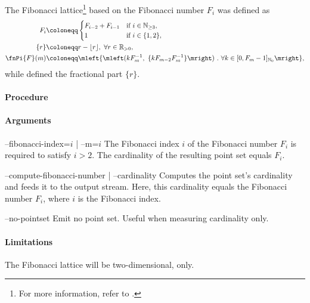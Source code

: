 
The Fibonacci lattice\footnote{For more information, refer to .} based on the Fibonacci number $F_i$ was defined as
\begin{align*}
  F_i &\coloneqq \begin{cases}
    F_{i-2} + F_{i-1} & \text{if}\ i \in \mathbb N_{\geq 3}, \\
    1 & \text{if}\ i \in \{1,2\},
  \end{cases}\\
  \{r\} &\coloneqq r - \lfloor r \rfloor,\ \forall r \in \mathbb R_{> 0}, \\
  \fnPi{F}(m) &\coloneqq \mleft\{ \mleft(k F_m^{-1},\ \{k F_{m-2} F_m^{-1}\} \mright)\ .\ \forall k \in [0,F_m-1]_{\mathbb N_0} \mright\},
\end{align*}
while  defined the fractional part $\{r\}$.

\paragraph{Procedure}

\begin{synopsis}
\end{synopsis}

\paragraph{Arguments}

\begin{procarg}{--fibonacci-index=$i$ | --m=$i$}
  The Fibonacci index $i$ of the Fibonacci number $F_i$ is required to satisfy $i > 2$. The cardinality of the resulting point set equals $F_i$.
\end{procarg}

\begin{procarg}{--compute-fibonacci-number | --cardinality}
  Computes the point set’s cardinality and feeds it to the output stream. Here, this cardinality equals the Fibonacci number $F_i$, where $i$ is the Fibonacci index.
\end{procarg}

\begin{procarg}{--no-pointset}
  Emit no point set. Useful when measuring cardinality only.
\end{procarg}

\procargout

\procargdelimiter

\procargsilent

\paragraph{Limitations}
The Fibonacci lattice will be two-dimensional, only.

